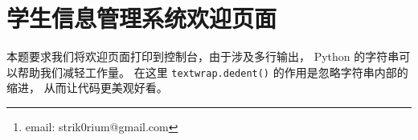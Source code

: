 \documentclass[openany, 10pt]{ctexart}
\title{\thetitle}
\author{Strik0r
\thanks{email: strik0rium@gmail.com}}
\begin{document}


\newpage
{\small \setlength{\parskip}{0em} \tableofcontents}

\section{学生信息管理系统欢迎页面}

本题要求我们将欢迎页面打印到控制台，由于涉及多行输出，
Python 的字符串可以帮助我们减轻工作量。
在这里 \lstinline`textwrap.dedent()` 的作用是忽略字符串内部的缩进，
从而让代码更美观好看。



\begin{thebibliography}{99}

\end{thebibliography}
\end{document}
